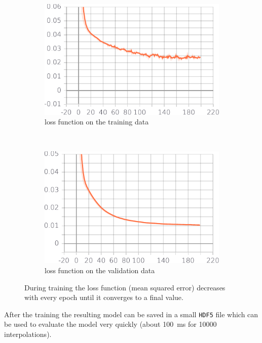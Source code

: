 \begin{figure}[h] %
	\centering
	\begin{subfigure}[t]{0.5\textwidth}
		\centering
		\includegraphics[width=\linewidth]{images/loss.pdf}
		\caption{loss function on the training data}
		\label{fig:loss}
	\end{subfigure}%
	~ 
	\begin{subfigure}[t]{0.5\textwidth}
		\centering
		\includegraphics[width=\linewidth]{images/val_loss.pdf}
		\caption{loss function on the validation data}
		\label{fig:val_loss}
	\end{subfigure}
	\caption{During training the loss function (mean squared error) decreases with every epoch until it converges to a final value.}
	\label{fig:loss_val}
	
\end{figure}

After the training the resulting model can be saved in a small \texttt{HDF5} file which can be used to evaluate the model very quickly (about \SI{100}{\milli\second} for \num{10000} interpolations).


